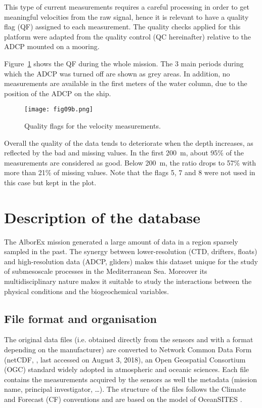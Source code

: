 \documentclass[essd]{copernicus}
\begin{document}
This type of current measurements requires a careful processing in order to get meaningful velocities from the raw signal, hence it is relevant to have a quality flag (QF) assigned to each measurement. The quality checks applied for this platform were adapted from the quality control (QC hereinafter) relative to the ADCP mounted on a mooring.

Figure~\ref{fig9b:adcpQC} shows the QF during the whole mission. The 3 main periods during which the ADCP was turned off are shown as grey areas. In addition, no measurements are available in the first meters of the water column, due to the position of the ADCP on the ship.

\begin{figure}[h]
\texttt{[image: fig09b.png]}
\caption{Quality flags for the velocity measurements.\label{fig9b:adcpQC}}
\end{figure}

Overall the quality of the data tends to deteriorate when the depth increases, as reflected by the bad and missing values. In the first 200~m, about 95\% of the measurements are considered as good. Below 200~m, the ratio drops to 57\% with more than 21\% of missing values. Note that the flags 5, 7 and 8 were not used in this case but kept in the plot.

\section{Description of the database\label{sec:database}}

The AlborEx mission generated a large amount of data in a region sparsely sampled in the past. The synergy between lower-resolution (CTD, drifters, floats) and high-resolution data (ADCP, gliders) makes this dataset unique for the study of submesoscale processes in the Mediterranean Sea. Moreover its multidisciplinary nature makes it suitable to study the interactions between the physical conditions and the biogeochemical variables.

\subsection{File format and organisation}

The original data files (i.e. obtained directly from the sensors and with a format depending on the manufacturer) are converted to Network Common Data Form (netCDF, , last accessed on August 3, 2018), an Open Geospatial Consortium (OGC) standard widely adopted in atmospheric and oceanic sciences. Each file contains the measurements acquired by the sensors as well the metadata (mission name, principal investigator, \ldots). The structure of the files follows the Climate and Forecast (CF) conventions \citep{DOMENICO13} and are based on the model of OceanSITES \citep{SEND2010}. 
\end{document}
